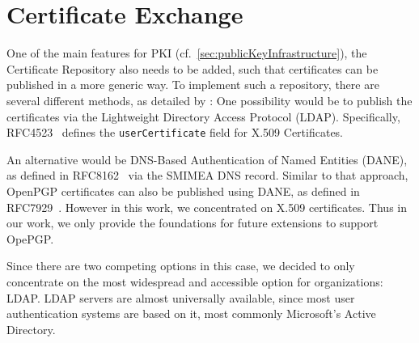 \section{Certificate Exchange}\label{sec:certificateExchange}
One of the main features for PKI (cf.~\ref{sec:publicKeyInfrastructure}), the Certificate Repository also needs to be
added, such that certificates can be published in a more generic way.
To implement such a repository, there are several different methods, as detailed by
\citet{hauner2016interoperability}:
One possibility would be to publish the certificates via the Lightweight Directory Access Protocol (LDAP).
Specifically, RFC4523~\cite{RFC4523} defines the \lstinline{userCertificate} field for X.509 Certificates.

An alternative would be DNS-Based Authentication of Named Entities (DANE), as defined in RFC8162~\cite{RFC8162} via the
SMIMEA DNS record.
Similar to that approach, OpenPGP certificates can also be published using DANE, as defined in RFC7929~\cite{RFC7929}.
However in this work, we concentrated on X.509 certificates.
Thus in our work, we only provide the foundations for future extensions to support OpePGP\@.

Since there are two competing options in this case, we decided to only concentrate on the most widespread and accessible
option for organizations: LDAP\@.
LDAP servers are almost universally available, since most user authentication systems are based on it, most commonly
Microsoft's Active Directory.
